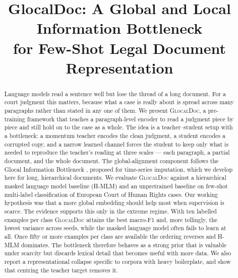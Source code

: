 \documentclass[conference]{IEEEtran}
\newcommand{\glocal}{\textsc{GlocalDoc}}
\newcommand{\hmlm}{\mbox{H-MLM}}
\begin{document}
\title{GlocalDoc: A Global and Local Information Bottleneck\\ for Few-Shot Legal Document Representation}

\author{%
\and
{}
}

\maketitle

\begin{abstract}
Language models read a sentence well but lose the thread of a long document. For a
court judgment this matters, because what a case is really about is spread across
many paragraphs rather than stated in any one of them. We present \glocal{}, a
pre-training framework that teaches a paragraph-level encoder to read a judgment
piece by piece and still hold on to the case as a whole. The idea is a
teacher--student setup with a bottleneck: a momentum teacher encodes the clean
judgment, a student encodes a corrupted copy, and a narrow learned channel forces
the student to keep only what is needed to reproduce the teacher's reading at three
scales --- each paragraph, a partial document, and the whole document. The
global-alignment component follows the Glocal Information Bottleneck
\cite{yang2025glocal}, proposed for time-series imputation, which we develop here
for long, hierarchical documents. We evaluate \glocal{} against a hierarchical masked
language model baseline (\hmlm{}) and an unpretrained baseline on few-shot
multi-label classification of European Court of Human Rights cases. Our working
hypothesis was that a more global embedding should help most when supervision is
scarce. The evidence supports this only in the extreme regime. With ten labelled
examples per class \glocal{} attains the best macro-F1 and, more tellingly, the
lowest variance across seeds, while the masked language model often fails to learn
at all. Once fifty or more examples per class are available the ordering reverses
and \hmlm{} dominates. The bottleneck therefore behaves as a strong prior that is
valuable under scarcity but discards lexical detail that becomes useful with more
data. We also report a representational collapse specific to corpora with heavy
boilerplate, and show that centring the teacher target removes it.
\end{abstract}
\end{document}
